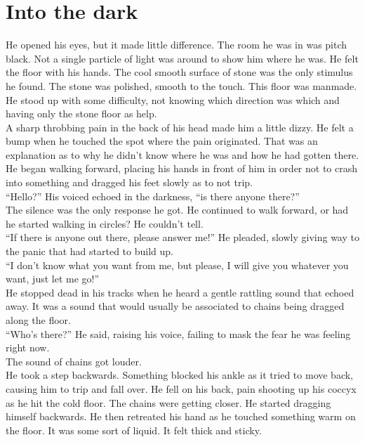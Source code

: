 \documentclass[a4paper,onecolumn,11pt]{article}
\begin{document}
\section{Into the dark}

He opened his eyes, but it made little difference. The room he was in was pitch black. Not a single particle of light was around to show him where he was. He felt the floor with his hands. The cool smooth surface of stone was the only stimulus he found. The stone was polished, smooth to the touch. This floor was manmade. He stood up with some difficulty, not knowing which direction was which and having only the stone floor as help.\\
\newline
A sharp throbbing pain in the back of his head made him a little dizzy. He felt a bump when he touched the spot where the pain originated. That was an explanation as to why he didn’t know where he was and how he had gotten there. He began walking forward, placing his hands in front of him in order not to crash into something and dragged his feet slowly as to not trip.\\
\newline
``Hello?'' His voiced echoed in the darkness, ``is there anyone there?''\\
\newline
The silence was the only response he got. He continued to walk forward, or had he started walking in circles? He couldn't tell.\\
\newline
``If there is anyone out there, please answer me!'' He pleaded, slowly giving way to the panic that had started to build up.\\
\newline
``I don't know what you want from me, but please, I will give you whatever you want, just let me go!''\\
\newline
He stopped dead in his tracks when he heard a gentle rattling sound that echoed away. It was a sound that would usually be associated to chains being dragged along the floor.\\
\newline
``Who's there?'' He said, raising his voice, failing to mask the fear he was feeling right now.\\
\newline
The sound of chains got louder.\\
\newline
He took a step backwards. Something blocked his ankle as it tried to move back, causing him to trip and fall over. He fell on his back, pain shooting up his coccyx as he hit the cold floor. The chains were getting closer. He started dragging himself backwards. He then retreated his hand as he touched something warm on the floor. It was some sort of liquid. It felt thick and sticky.\\
\end{document}
